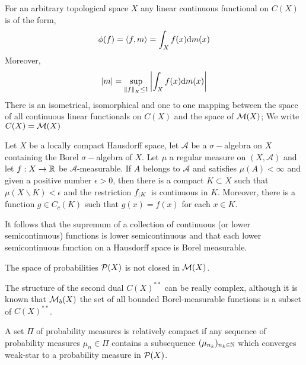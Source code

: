 \begin{theorem}[Aleksandrov]
	For an arbitrary topological space $X$ any linear continuous functional on $C(X)$ is of the form,
	\begin{equation}
		\phi(f)=\anglesbox{f,m}=\int_{X}f(x)\diff m(x)
	\end{equation}
	Moreover,
	\begin{equation}
		\abs{m}=\sup_{\norm{f}_X\leq 1}\abs{\int_{X}f(x)\diff m(x)}
	\end{equation}
	There is an isometrical, isomorphical and one to one mapping between the space of all continuous linear functionals on $C(X)$ and the space of $\MeasureSp(X)$; We write $C(X)=\MeasureSp(X)$
\end{theorem}

\begin{theorem}[Luizin]
	Let $X$ be a locally compact Hausdorff space, let $\mathcal A$ be a $\sigma-$algebra on $X$ containing the Borel $\sigma-$algebra of $X$. Let $\mu$ a regular measure on $(X, \mathcal A)$ and let $f:X\rightarrow \Real$ be $\mathcal A$-measurable. If $A$ belongs to $\mathcal{A}$ and satisfies $\mu(A)<\infty$ and given a positive number $\epsilon>0$, then there is a compact $K\subset X$ such that $\mu(X\backslash K)<\epsilon$ and the restriction $\domainrestr{K}{f}$ is continuous in $K$. Moreover, there is a function $g\in C_c(K)$ such that $g(x)=f(x)$ for each $x\in K$. 
\end{theorem}

It follows that the supremum of a collection of continuous (or lower semicontinuous) functions is lower semicontinuous and that each lower semicontinuous function on a Hausdorff space is Borel measurable. 


The space of probabilities $\PlanSp(X)$ is not closed in $\MeasureSp(X)$. 



The structure of the second dual $C(X)^{**}$ can be really complex, although it is known that $\MeasureSp_b(X)$ the set of all bounded Borel-measurable functions is a subset of $C(X)^{**}$.

A set $\Pi$ of probability measures is relatively compact if any sequence of probability measures $\mu_n \in \Pi$ contains a subsequence $(\mu_{n_k})_{n_k\in \Naturals}$ which converges weak-star to a probability measure in $\PlanSp(X)$.


